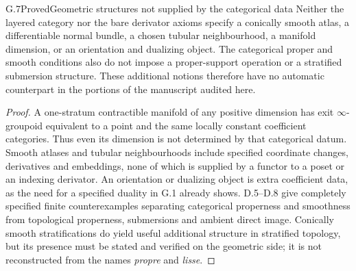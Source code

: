 \begin{statement}{G.7}{Proved}{Geometric structures not supplied by the categorical data}
Neither the layered category nor the bare derivator axioms specify a
conically smooth atlas, a differentiable normal bundle, a chosen
tubular neighbourhood, a manifold dimension, or an orientation and
dualizing object. The categorical proper and smooth conditions also
do not impose a proper-support operation or a stratified submersion
structure. These additional notions therefore have no automatic
counterpart in the portions of the manuscript audited here.
\end{statement}
\begin{proof}
A one-stratum contractible manifold of any positive dimension has exit
$\infty$-groupoid equivalent to a point and the same locally constant
coefficient categories. Thus even its dimension is not determined by
that categorical datum. Smooth atlases and tubular neighbourhoods
include specified coordinate changes, derivatives and embeddings,
none of which is supplied by a functor to a poset or an indexing
derivator. An orientation or dualizing object is extra coefficient
data, as the need for a specified duality in G.1 already shows.
D.5--D.8 give completely specified finite counterexamples separating
categorical properness and smoothness from topological properness,
submersions and ambient direct image. Conically smooth stratifications
do yield useful additional structure in stratified topology, but its
presence must be stated and verified on the geometric side; it is not
reconstructed from the names \emph{propre} and \emph{lisse}.
\end{proof}

